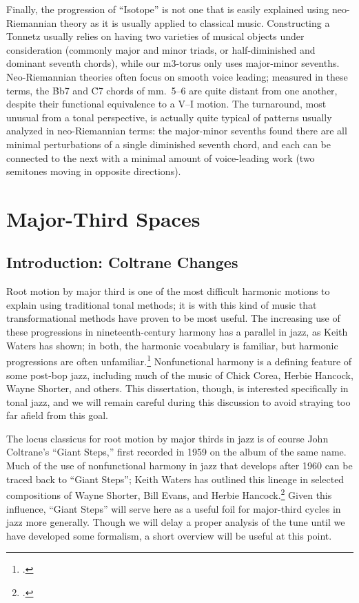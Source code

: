 Finally, the progression of ``Isotope'' is not one that is easily explained
using neo-Riemannian theory as it is usually applied to classical music.
Constructing a Tonnetz usually relies on having two varieties of musical objects
under consideration (commonly major and minor triads, or half-diminished and
dominant seventh chords), while our m3-torus only uses major-minor sevenths.
Neo-Riemannian theories often focus on smooth voice leading; measured in these
terms, the \h{Bb7} and \h{C7} chords of mm.~5--6 are quite distant from one
another, despite their functional equivalence to a V--I motion. The
turnaround, most unusual from a tonal perspective, is actually quite typical
of patterns usually analyzed in neo-Riemannian terms: the major-minor sevenths
found there are all minimal perturbations of a single diminished seventh
chord, and each can be connected to the next with a minimal amount of
voice-leading work (two semitones moving in opposite directions).

\section{Major-Third Spaces}
\label{sec:maj3-spaces}

\subsection{Introduction: Coltrane Changes}
\label{subsec:maj3-intro}

Root motion by major third is one of the most difficult harmonic motions to
explain using traditional tonal methods; it is with this kind of music that
transformational methods have proven to be most useful. The
increasing use of these progressions in nineteenth-century harmony has a
parallel in jazz, as Keith Waters has shown; in both, the harmonic vocabulary
is familiar, but harmonic progressions are often
unfamiliar.\footcite{waters:2013} Nonfunctional harmony is a defining
feature of some post-bop jazz, including much of the music of Chick Corea,
Herbie Hancock, Wayne Shorter, and others. This dissertation,
though, is interested specifically in tonal jazz, and we will remain careful
during this discussion to avoid straying too far afield from this goal.

The locus classicus for root motion by major thirds in jazz is of course John
Coltrane's ``Giant Steps,'' first recorded in 1959 on the album of the same
name. Much of the use of nonfunctional harmony in jazz that
develops after 1960 can be traced back to ``Giant Steps''; Keith Waters has
outlined this lineage in selected compositions of Wayne Shorter, Bill Evans,
and Herbie Hancock.\footcite{waters:2010} Given this influence, ``Giant
Steps'' will serve here as a useful foil for major-third cycles in jazz more
generally. Though we will delay a proper analysis of the tune until we have
developed some formalism, a short overview will be useful at this point.

